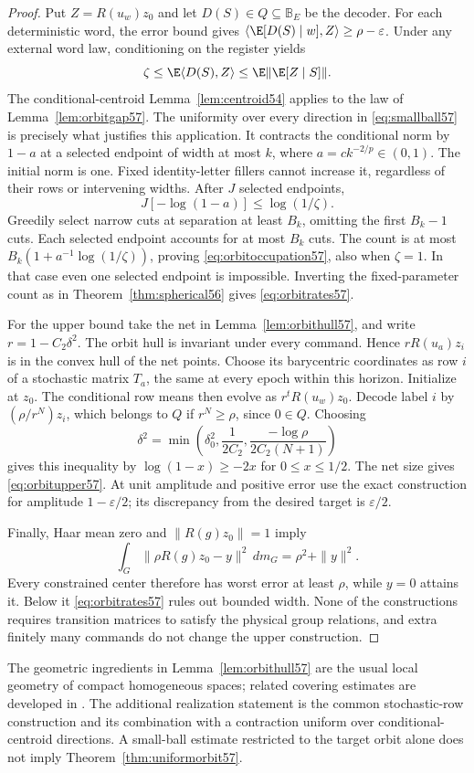 \begin{proof}
Put $Z=R(u_w)z_0$ and let $D(S)\in Q\subseteq\mathbb B_E$ be the decoder. For each deterministic word, the error bound gives
$\langle\E[D(S)\mid w],Z\rangle\ge\rho-\varepsilon$.
Under any external word law, conditioning on the register yields
\[
 \zeta\le\E\langle D(S),Z\rangle
          \le\E\|\E[Z\mid S]\|.
\]
The conditional-centroid Lemma~\ref{lem:centroid54} applies to the law of Lemma~\ref{lem:orbitgap57}. The uniformity over every direction in \eqref{eq:smallball57} is precisely what justifies this application. It contracts the conditional norm by $1-a$ at a selected endpoint of width at most $k$, where $a=c k^{-2/p}\in(0,1)$. The initial norm is one. Fixed identity-letter fillers cannot increase it, regardless of their rows or intervening widths. After $J$ selected endpoints,
\[
 J[-\log(1-a)]\le\log(1/\zeta).
\]
Greedily select narrow cuts at separation at least $B_k$, omitting the first $B_k-1$ cuts. Each selected endpoint accounts for at most $B_k$ cuts. The count is at most $B_k(1+a^{-1}\log(1/\zeta))$, proving \eqref{eq:orbitoccupation57}, also when $\zeta=1$. In that case even one selected endpoint is impossible. Inverting the fixed-parameter count as in Theorem~\ref{thm:spherical56} gives \eqref{eq:orbitrates57}.

For the upper bound take the net in Lemma~\ref{lem:orbithull57}, and write $r=1-C_2\delta^2$. The orbit hull is invariant under every command. Hence $rR(u_a)z_i$ is in the convex hull of the net points. Choose its barycentric coordinates as row $i$ of a stochastic matrix $T_a$, the same at every epoch within this horizon. Initialize at $z_0$. The conditional row means then evolve as $r^tR(u_w)z_0$. Decode label $i$ by $(\rho/r^N)z_i$, which belongs to $Q$ if $r^N\ge\rho$, since $0\in Q$. Choosing
\[
 \delta^2=\min\left(\delta_0^2,\frac1{2C_2},
                          \frac{-\log\rho}{2C_2(N+1)}\right)
\]
gives this inequality by $\log(1-x)\ge-2x$ for $0\le x\le1/2$. The net size gives \eqref{eq:orbitupper57}. At unit amplitude and positive error use the exact construction for amplitude $1-\varepsilon/2$; its discrepancy from the desired target is $\varepsilon/2$.

Finally, Haar mean zero and $\|R(g)z_0\|=1$ imply
\[
 \int_G\|\rho R(g)z_0-y\|^2\,dm_G=\rho^2+\|y\|^2.
\]
Every constrained center therefore has worst error at least $\rho$, while $y=0$ attains it. Below it \eqref{eq:orbitrates57} rules out bounded width. None of the constructions requires transition matrices to satisfy the physical group relations, and extra finitely many commands do not change the upper construction.
\end{proof}
The geometric ingredients in Lemma~\ref{lem:orbithull57} are the usual local geometry of compact homogeneous spaces; related covering estimates are developed in \cite{Szarek57}. The additional realization statement is the common stochastic-row construction and its combination with a contraction uniform over conditional-centroid directions. A small-ball estimate restricted to the target orbit alone does not imply Theorem~\ref{thm:uniformorbit57}.
